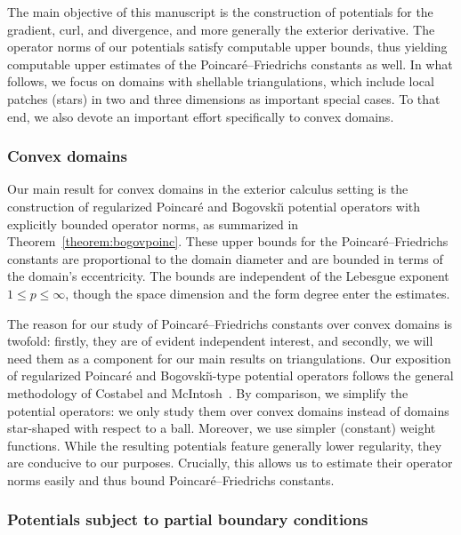 \documentclass[10pt,a4paper]{article}
\begin{document}
The main objective of this manuscript is the construction of potentials for the gradient, curl, and divergence, and more generally the exterior derivative.
The operator norms of our potentials satisfy computable upper bounds, thus yielding computable upper estimates of the Poincar\'e--Friedrichs constants as well.
In what follows, we focus on domains with shellable triangulations, which include local patches (stars) in two and three dimensions as important special cases.
To that end, we also devote an important effort specifically to convex domains.


\subsubsection{Convex domains}

Our main result for convex domains in the exterior calculus setting is the construction of regularized Poincar\'e and Bogovski\u{\i} potential operators with explicitly bounded operator norms, as summarized in Theorem~\ref{theorem:bogovpoinc}.
These upper bounds for the Poincar\'e--Friedrichs constants are proportional to the domain diameter and are bounded in terms of the domain's eccentricity.
The bounds are independent of the Lebesgue exponent $1 \leq p \leq \infty$, though the space dimension and the form degree enter the estimates.

The reason for our study of Poincar\'e--Friedrichs constants over convex domains is twofold:
firstly, they are of evident independent interest, and secondly, we will need them as a component for our main results on triangulations.
Our exposition of regularized Poincar\'e and Bogovski\u{\i}-type potential operators follows the general methodology of Costabel and McIntosh~\cite{costabel2010bogovskiui}.
By comparison, we simplify the potential operators:
we only study them over convex domains instead of domains star-shaped with respect to a ball. Moreover, we use simpler (constant) weight functions.
While the resulting potentials feature generally lower regularity, they are conducive to our purposes.
Crucially, this allows us to estimate their operator norms easily and thus bound Poincar\'e--Friedrichs constants.


\subsubsection{Potentials subject to partial boundary conditions}
\end{document}
